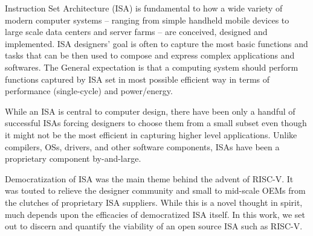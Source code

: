 

Instruction Set Architecture (ISA) is fundamental to how a wide variety of modern computer systems -- ranging from simple handheld mobile devices to large scale data centers and server farms -- are conceived, designed and implemented. ISA designers' goal is often to capture the most basic functions and tasks that can be then used to compose and express complex applications and softwares. The General expectation is that a computing system should perform functions captured by ISA set in most possible efficient way in terms of performance (single-cycle) and power/energy. 

While an ISA is central to computer design, there have been only a handful of successful ISAs forcing designers to choose them from a small subset even though it might not be the most efficient in capturing higher level applications. Unlike compilers, OSs, drivers, and other software components, ISAs have been a proprietary component by-and-large.

Democratization of ISA was the main theme behind the advent of RISC-V. It was touted to relieve the designer community and small to mid-scale OEMs from the clutches of proprietary ISA suppliers. While this is a novel thought in spirit, much depends upon the efficacies of democratized ISA itself. In this work, we set out to discern and quantify the viability of an open source ISA such as RISC-V. 





